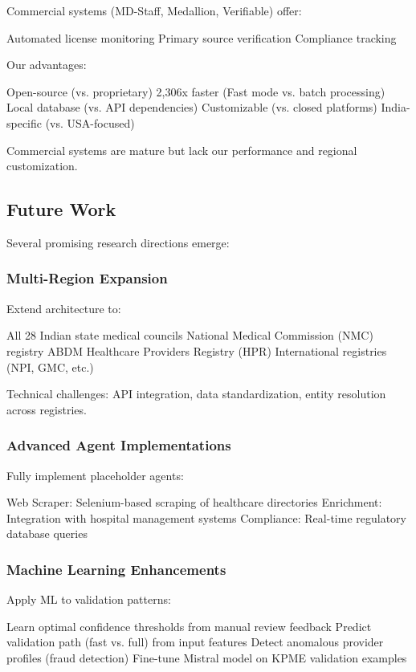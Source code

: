 \documentclass[conference]{IEEEtran}
\begin{document}
Commercial systems (MD-Staff, Medallion, Verifiable) offer:

Automated license monitoring
Primary source verification
Compliance tracking

Our advantages:

Open-source (vs. proprietary)
2,306x faster (Fast mode vs. batch processing)
Local database (vs. API dependencies)
Customizable (vs. closed platforms)
India-specific (vs. USA-focused)

Commercial systems are mature but lack our performance and regional customization.

\subsection{Future Work}

Several promising research directions emerge:

\subsubsection{Multi-Region Expansion}

Extend architecture to:

All 28 Indian state medical councils
National Medical Commission (NMC) registry
ABDM Healthcare Providers Registry (HPR)
International registries (NPI, GMC, etc.)

Technical challenges: API integration, data standardization, entity resolution across registries.

\subsubsection{Advanced Agent Implementations}

Fully implement placeholder agents:

Web Scraper: Selenium-based scraping of healthcare directories
Enrichment: Integration with hospital management systems
Compliance: Real-time regulatory database queries

\subsubsection{Machine Learning Enhancements}

Apply ML to validation patterns:

Learn optimal confidence thresholds from manual review feedback
Predict validation path (fast vs. full) from input features
Detect anomalous provider profiles (fraud detection)
Fine-tune Mistral model on KPME validation examples
\end{document}
